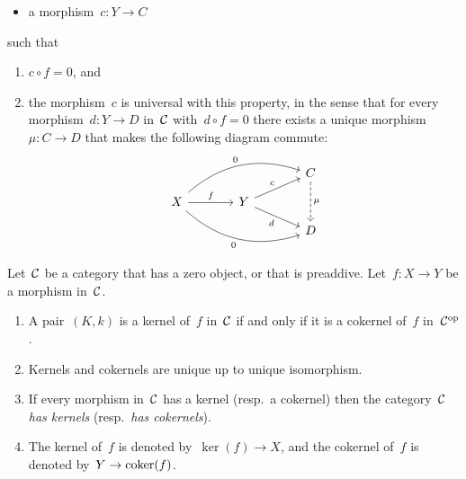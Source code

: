 \begin{definition}
\begin{enumerate}
\begin{itemize}
          \item
            a morphism~$c \colon Y \to C$
        \end{itemize}
        such that
        \begin{enumerate}[label=(C\arabic*)]
          \item
            $c \circ f = 0$, and
          \item
            the morphism~$c$ is universal with this property, in the sense that
            for every morphism~$d \colon Y \to D$ in~$\mathcal{C}$ with~$d \circ f = 0$ there exists a unique morphism~$\mu \colon C \to D$ that makes the following diagram commute:
            \[
              \begin{tikzcd}[row sep = small, column sep = large]
                  {}
                & {}
                & C
                  \arrow[dashed]{dd}[right]{\mu}
                \\
                  X
                  \arrow{r}[above]{f}
                  \arrow[bend left]{urr}[above left]{0}
                  \arrow[bend right]{drr}[below left]{0}
                & Y
                  \arrow{ur}[above left]{c}
                  \arrow{dr}[below left]{d}
                & {}
                \\
                  {}
                & {}
                & D
              \end{tikzcd}
            \]
        \end{enumerate}
  \end{enumerate}
\end{definition}


\begin{remark}
  Let~$\mathcal{C}$ be a category that has a zero object, or that is preaddive.
  Let~$f \colon X \to Y$ be a morphism in~$\mathcal{C}$.
  \begin{enumerate}
    \item
      A pair~$(K,k)$ is a kernel of~$f$ in~$\mathcal{C}$ if and only if it is a cokernel of~$f$ in~$\mathcal{C}^{\mathrm{op}}$.
    \item
      Kernels and cokernels are unique up to unique isomorphism.
    \item
      If every morphism in~$\mathcal{C}$ has a kernel (resp.\ a cokernel) then the category~$\mathcal{C}$ \emph{has kernels} (resp.\ \emph{has cokernels}).
    \item
      The kernel of~$f$ is denoted by~$\ker(f) \to X$, and the cokernel of~$f$ is denoted by~$Y \to \operatorname{coker}(f)$.
  \end{enumerate}
\end{remark}


